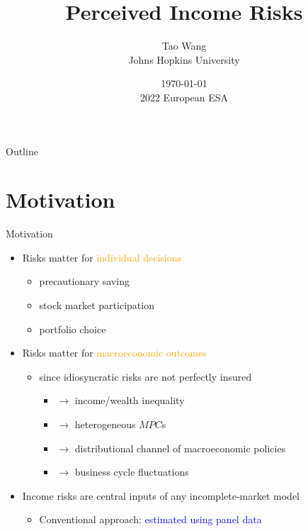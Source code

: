 \documentclass{beamer}
\title{Perceived Income Risks}
\author{Tao Wang \\ Johns Hopkins University}
\date{\today \\
	2022 European ESA}
\begin{document}
	

\begin{frame}
	\titlepage
\end{frame}
\begin{frame}{Outline}
	\tableofcontents
\end{frame}


\section{Motivation}


\begin{frame}{Motivation}
	\begin{itemize}
		\item Risks matter for \textcolor{orange}{individual decisions}
		\begin{itemize}
			\item precautionary saving 
			\item stock market participation
			\item portfolio choice 
		\end{itemize} 
		\item Risks matter for \textcolor{orange}{macroeconomic outcomes}
		\begin{itemize}
			\item since idiosyncratic risks are not perfectly insured 
			\begin{itemize}
				\item $\rightarrow$ income/wealth inequality 
				\item $\rightarrow$ heterogeneous $MPC$s
				\item $\rightarrow$ distributional channel of macroeconomic policies 
				\item $\rightarrow$ business cycle fluctuations
			\end{itemize}
		\end{itemize}  %
	\item Income risks are central inputs of any incomplete-market model   
	\begin{itemize}
		\item Conventional approach: \textcolor{blue}{estimated using panel data}

\end{itemize}
\end{itemize}
\end{frame}
\end{document}
